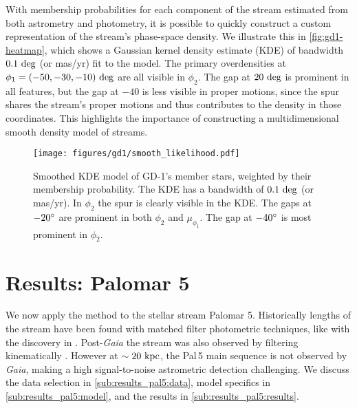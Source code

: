 \documentclass[twocolumn]{aastex631}
\newcommand{\stream}[1]{#1}
\newcommand{\dataarchive}[1]{\textit{#1}}
\newcommand{\Gaia}{\dataarchive{Gaia}}
\begin{document}
        With membership probabilities for each component of the stream estimated
        from both astrometry and photometry, it is possible to quickly construct
        a custom representation of the stream's phase-space density. We
        illustrate this in  \autoref{fig:gd1-heatmap}, which shows a Gaussian
        kernel density estimate (KDE) of bandwidth $0.1 \ \rm{deg}$ (or mas/yr)
        fit to the model. The primary overdensities at $\phi_1 = (-50, -30, -10)
        \ \rm{deg}$ are all visible in $\phi_2$. The gap at $20 \ \rm{deg}$ is
        prominent in all features, but the gap at $-40$ is less visible in
        proper motions, since the spur shares the stream's proper motions and
        thus contributes to the density in those coordinates. This highlights
        the importance of constructing a multidimensional smooth density model
        of streams.

        \begin{figure}[ht]
            \centering
            \hspace{-25 pt}\texttt{[image: figures/gd1/smooth\_likelihood.pdf]}
            \caption{%
                Smoothed KDE model of \stream{GD-1}'s member stars, weighted by
                their membership probability. The KDE has a bandwidth of $0.1 \
                \rm{deg}$ (or mas/yr).  In $\phi_2$ the spur is clearly visible
                in the KDE.  The gaps at $-20\degree$ are prominent in both
                $\phi_2$ and $\mu_{\phi_1}$.  The gap at $-40\degree$ is most
                prominent in $\phi_2$.
            }
            \label{fig:gd1-heatmap}
        \end{figure}




\section{Results: Palomar 5} \label{sec:results_pal5}

    We now apply the method to the stellar stream \stream{Palomar 5}.
    Historically lengths of the stream have been found with matched filter
    photometric techniques, like with the discovery in \citet{Odenkirchen+2001}.
    Post-\Gaia{} the stream was also observed by filtering kinematically
    \cite[e.g.,][]{Starkman+2019, Ibata+2021}.  However at $\sim 20 \ \rm{kpc}$,
    the \stream{Pal\,5} main sequence is not observed by \Gaia{}, making a high
    signal-to-noise astrometric detection challenging.  We discuss the data
    selection in \autoref{sub:results_pal5:data}, model specifics in
    \autoref{sub:results_pal5:model}, and the results in
    \autoref{sub:results_pal5:results}.
\end{document}
